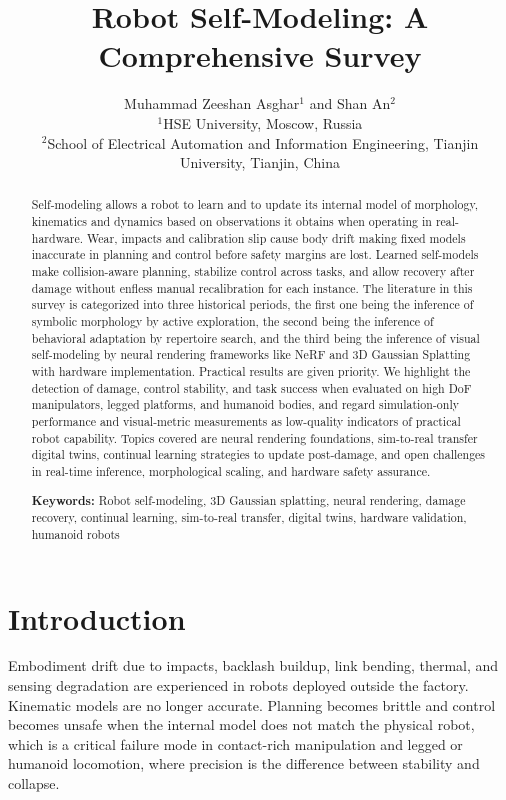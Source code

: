 \documentclass[11pt,a4paper]{article}
\title{Robot Self-Modeling: A Comprehensive Survey}
\author{Muhammad Zeeshan Asghar$^{1}$ and Shan An$^{2}$\\
\small $^{1}$HSE University, Moscow, Russia \\
\small $^{2}$School of Electrical Automation and Information Engineering, Tianjin University, Tianjin, China
}
\begin{document}
\maketitle


\begin{abstract}
Self-modeling allows a robot to learn and to update its internal model of morphology, kinematics and dynamics based on observations it obtains when operating in real-hardware. Wear, impacts and calibration slip cause body drift making fixed models inaccurate in planning and control before safety margins are lost. Learned self-models make collision-aware planning, stabilize control across tasks, and allow recovery after damage without enfless manual recalibration for each instance. The literature in this survey is categorized into three historical periods, the first one being the inference of symbolic morphology by active exploration, the second being the inference of behavioral adaptation by repertoire search, and the third being the inference of visual self-modeling by neural rendering frameworks like NeRF and 3D Gaussian Splatting with hardware implementation. Practical results are given priority. We highlight the detection of damage, control stability, and task success when evaluated on high DoF manipulators, legged platforms, and humanoid bodies, and regard simulation-only performance and visual-metric measurements as low-quality indicators of practical robot capability. Topics covered are neural rendering foundations, sim-to-real transfer digital twins, continual learning strategies to update post-damage, and open challenges in real-time inference, morphological scaling, and hardware safety assurance.


\vspace{0.5cm}
\noindent \textbf{Keywords:} Robot self-modeling, 3D Gaussian splatting, neural rendering, damage recovery, continual learning, sim-to-real transfer, digital twins, hardware validation, humanoid robots
\end{abstract}



\section{Introduction}
\label{sec:introduction}

Embodiment drift due to impacts, backlash buildup, link bending, thermal, and sensing degradation are experienced in robots deployed outside the factory. Kinematic models are no longer accurate. Planning becomes brittle and control becomes unsafe when the internal model does not match the physical robot, which is a critical failure mode in contact-rich manipulation and legged or humanoid locomotion, where precision is the difference between stability and collapse.
\end{document}
